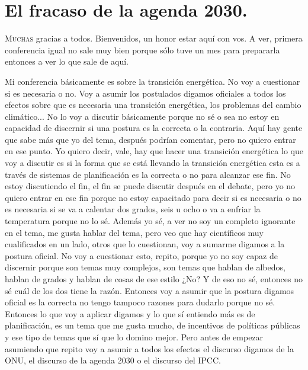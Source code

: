 \chapter{El fracaso de la agenda 2030.}


\lettrine[lines=2, findent=3pt, nindent=0pt]{M}{uchas} gracias a todos. Bienvenidos, un honor estar aquí con vos. A ver, primera conferencia igual no sale muy bien porque sólo tuve un mes para prepararla entonces a ver lo que sale de aquí.

Mi conferencia básicamente es sobre la transición energética. No voy a cuestionar si es necesaria o no. Voy a asumir los postulados digamos oficiales a todos los efectos sobre que es necesaria una transición energética, los problemas del cambio climático... No lo voy a discutir básicamente porque no sé o sea no estoy en capacidad de discernir si una postura es la correcta o la contraria. Aquí hay gente que sabe más que yo del tema, después podrían comentar, pero no quiero entrar en ese punto. Yo quiero decir, vale, hay que hacer una transición energética lo que voy a discutir es si la forma que se está llevando la transición energética esta es a través de sistemas de planificación es la correcta o no para alcanzar ese fin. No estoy discutiendo el fin, el fin se puede discutir después en el debate, pero yo no quiero entrar en ese fin porque no estoy capacitado para decir si es necesaria o no es necesaria si se va a calentar dos grados, seis u ocho o va a enfriar la temperatura porque no lo sé. Además yo sé, a ver no soy un completo ignorante en el tema, me gusta hablar del tema, pero veo que hay científicos muy cualificados en un lado, otros que lo cuestionan, voy a sumarme digamos a la postura oficial. No voy a cuestionar esto, repito, porque yo no soy capaz de discernir porque son temas muy complejos, son temas que hablan de albedos, hablan de grados y hablan de cosas de ese estilo ¿No? Y de eso no sé, entonces no sé cuál de los dos tiene la razón. Entonces voy a asumir que la postura digamos oficial es la correcta no tengo tampoco razones para dudarlo porque no sé. Entonces lo que voy a aplicar digamos y lo que sí entiendo más es de planificación, es un tema que me gusta mucho, de incentivos de políticas públicas y ese tipo de temas que sí que lo domino mejor. Pero antes de empezar asumiendo que repito voy a asumir a todos los efectos el discurso digamos de la ONU, el discurso de la agenda 2030 o el discurso del IPCC.

